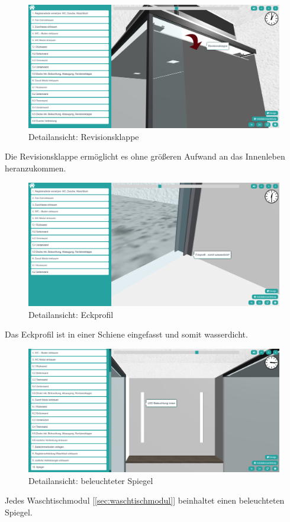 \begin{figure}[h]
    \centering
    \includegraphics[width=1\linewidth]{images/screenshots/06a.png}
    \caption{Detailansicht: Revisionsklappe}
    \label{}
\end{figure}
\noindent Die Revisionsklappe ermöglicht es ohne größeren Aufwand an das Innenleben heranzukommen.
\clearpage \newpage
\begin{figure}[h]
    \centering
    \includegraphics[width=1\linewidth]{images/screenshots/07.png}
    \caption{Detailansicht: Eckprofil}
    \label{}
\end{figure}
\noindent Das Eckprofil ist in einer Schiene eingefasst und somit wasserdicht.

\begin{figure}[h]
    \centering
    \includegraphics[width=1\linewidth]{images/screenshots/08.png}
    \caption{Detailansicht: beleuchteter Spiegel}
    \label{}
\end{figure}
\noindent Jedes Waschtischmodul [\ref{sec:waschtischmodul}] beinhaltet einen beleuchteten Spiegel.

